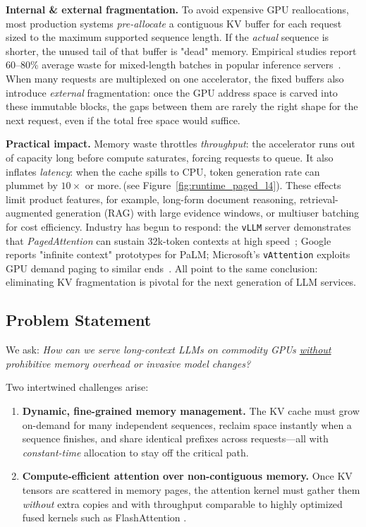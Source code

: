 \documentclass[conference]{IEEEtran}
\begin{document}
\vspace{0.5em}
\noindent\textbf{Internal \& external fragmentation.}
To avoid expensive GPU reallocations, most production systems \emph{pre-allocate} a contiguous KV buffer for each request sized to the maximum supported sequence length.  If the \emph{actual} sequence is shorter, the unused tail of that buffer is "dead" memory.  Empirical studies report 60–80\% average waste for mixed-length batches in popular inference servers~\cite{kwon2023pagedattention,deepspeed2023blog}.  When many requests are multiplexed on one accelerator, the fixed buffers also introduce \emph{external} fragmentation: once the GPU address space is carved into these immutable blocks, the gaps between them are rarely the right shape for the next request, even if the total free space would suffice. 

\vspace{0.5em}
\noindent\textbf{Practical impact.}
Memory waste throttles \emph{throughput}: the accelerator runs out of capacity long before compute saturates, forcing requests to queue.  It also inflates \emph{latency}: when the cache spills to CPU, token generation rate can plummet by $10{\times}$ or more.\,(see Figure~\ref{fig:runtime_paged_l4}).  These effects limit product features, for example, long-form document reasoning, retrieval-augmented generation (RAG) with large evidence windows, or multiuser batching for cost efficiency.  Industry has begun to respond: the \texttt{vLLM} server demonstrates that \emph{PagedAttention} can sustain 32k-token contexts at high speed~\cite{kwon2023pagedattention}; Google reports "infinite context" prototypes for PaLM; Microsoft's \texttt{vAttention} exploits GPU demand paging to similar ends~\cite{prabhu2024vattention}.  All point to the same conclusion: eliminating KV fragmentation is pivotal for the next generation of LLM services.

\subsection{Problem Statement}
We ask: \textit{How can we serve long-context LLMs on commodity GPUs \underline{without} prohibitive memory overhead or invasive model changes?}  

Two intertwined challenges arise:

\begin{enumerate}
    \item \textbf{Dynamic, fine-grained memory management.}  The KV cache must grow on-demand for many independent sequences, reclaim space instantly when a sequence finishes, and share identical prefixes across requests—all with \emph{constant-time} allocation to stay off the critical path.
    \item \textbf{Compute-efficient attention over non-contiguous memory.}  Once KV tensors are scattered in memory pages, the attention kernel must gather them \emph{without} extra copies and with throughput comparable to highly optimized fused kernels such as FlashAttention \cite{dao2022flashattention}.
\end{enumerate}
\end{document}
